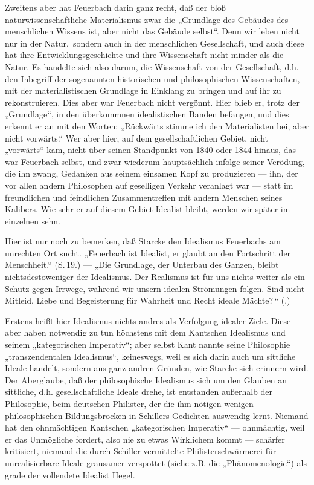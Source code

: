 Zweitens aber hat Feuerbach darin ganz recht, daß der bloß
naturwissenschaftliche Materialismus zwar die „Grundlage des Gebäudes
des menschlichen Wissens ist, aber nicht das Gebäude selbst``. Denn wir
leben nicht nur in der Natur,\est\ sondern auch in der menschlichen
Gesellschaft, und auch diese hat ihre Entwicklungsgeschichte und ihre
Wissenschaft nicht minder als die Natur. Es handelte sich also darum,
die Wissenschaft von der Gesellschaft, d.h. den Inbegriff der
sogenannten historischen und philosophischen Wissenschaften, mit der
materialistischen Grundlage %
in Einklang zu bringen und auf ihr zu rekonstruieren. Dies aber war
Feuerbach nicht vergönnt. Hier blieb er, trotz der „Grundlage``, in den
überkommnen idealistischen Banden befangen, und dies erkennt er an mit
den Worten: „Rückwärts stimme ich den Materialisten bei, aber nicht
vorwärts.`` Wer aber hier, auf dem gesellschaftlichen Gebiet, nicht
„vorwärts`` kam, nicht über seinen Standpunkt von 1840 oder 1844 hinaus,
das war Feuerbach selbst, und zwar wiederum hauptsächlich infolge seiner
Verödung, die ihn zwang, Gedanken aus seinem einsamen Kopf zu
produzieren --- ihn, der vor allen andern Philosophen auf geselligen
Verkehr veranlagt war --- statt im freundlichen und feindlichen
Zusammentreffen mit andern Menschen seines Kalibers. Wie sehr er auf
diesem Gebiet Idealist bleibt, werden wir später im einzelnen sehn.

Hier ist nur noch zu bemerken, daß Starcke den Idealismus
Feuerbachs am unrechten Ort sucht. „Feuerbach ist Idealist, er glaubt an
den Fortschritt der Menschheit.`` (S.\,19.) --- „Die Grundlage, der Unterbau
des Ganzen, bleibt nichtsdestoweniger der Idealismus. Der Realismus ist
für uns nichts weiter als ein Schutz gegen Irrwege, während wir unsern
idealen Strömungen folgen. Sind nicht Mitleid, Liebe und Begeisterung
für Wahrheit und Recht ideale Mächte?\,`` (.)

Erstens heißt hier Idealismus nichts andres als Verfolgung
idealer Ziele. Diese aber haben notwendig zu tun höchstens mit dem
Kantschen Idealismus und seinem „kategorischen Imperativ``; aber selbst
Kant nannte seine Philosophie „transzendentalen Idealismus``, keineswegs,
weil es sich darin auch um sittliche Ideale handelt, sondern aus ganz
andren Gründen, wie Starcke sich erinnern wird. Der Aberglaube, daß der
philosophische Idealismus sich um den Glauben an sittliche, d.h.
gesellschaftliche Ideale drehe, ist entstanden außerhalb der
Philosophie, beim deutschen Philister, der die ihm nötigen wenigen
philosophischen Bildungsbrocken in Schillers Gedichten auswendig lernt.
Niemand hat den ohnmächtigen Kantschen „kategorischen Imperativ`` ---
ohnmächtig, weil er das Unmögliche fordert, also nie zu etwas Wirklichem
kommt --- schärfer kritisiert, niemand die durch Schiller vermittelte
Philisterschwärmerei für unrealisierbare Ideale grausamer verspottet
(siehe z.B. die „Phänomenologie``) als grade der vollendete Idealist
Hegel.

